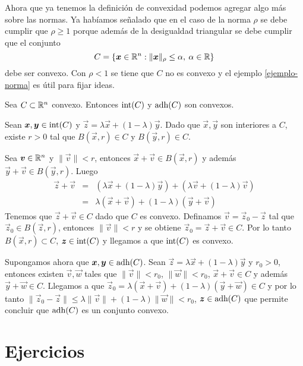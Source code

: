 Ahora que ya tenemos la definici\'on de convexidad podemos agregar algo m\'as sobre las normas. Ya hab\'iamos se\~nalado que en el caso de la norma $\rho$ se debe cumplir que $\rho \geq 1$ porque adem\'as de la desigualdad triangular se debe cumplir que el conjunto
$$C = \{\boldsymbol{x} \in \mathbb{R}^n : \|\boldsymbol{x}\|_{\rho} \leq \alpha,\: \alpha \in \mathbb{R}\}$$
debe ser convexo. Con $\rho <1$ se tiene que $C$ no es convexo y el ejemplo \ref{ejemplo-norma} es \'util para fijar ideas.

\begin{proposicion}
Sea $C \subset \mathbb{R}^n$ convexo. Entonces $\text{int}({C})$ y $\text{adh}({C})$ son convexos.
\end{proposicion}

\begin{demostracion}
Sean $\boldsymbol{x},\boldsymbol{y} \in \text{int}({C})$ y $\vec{z}=\lambda \vec{x} + (1-\lambda) \vec{y}$. Dado que $\vec{x},\vec{y}$ son interiores a $C$, existe $r > 0$ tal que $B(\vec{x},r)\in C$ y $B(\vec{y},r) \in C$. 

Sea $\boldsymbol{v}\in \mathbb{R}^n$ y $\|\vec{v}\|<r$, entonces $\vec{x}+\vec{v} \in B(\vec{x},r)$ y adem\'as $\vec{y}+\vec{v} \in B(\vec{y},r)$. Luego
\begin{eqnarray*}
\vec{z}+\vec{v} &=& \left(\lambda \vec{x} + (1-\lambda)\vec{y} \right) + \left(\lambda \vec{v} + (1-\lambda) \vec{v} \right) \\
&=& \lambda (\vec{x}+\vec{v}) + (1-\lambda) (\vec{y}+\vec{v})
\end{eqnarray*}
Tenemos que $\vec{z}+\vec{v} \in C$ dado que $C$ es convexo. Definamos $\vec{v}=\vec{z}_0-\vec{z}$ tal que $\vec{z}_0 \in B(\vec{z},r)$, entonces $\|\vec{v}\|<r$ y se obtiene $\vec{z}_0=\vec{z}+\vec{v} \in C$. Por lo tanto $B(\vec{x},r)\subset C$, $\boldsymbol{z}\in \text{int}({C})$ y llegamos a que $\text{int}({C})$ es convexo.

Supongamos ahora que $\boldsymbol{x},\boldsymbol{y} \in \text{adh}({C})$. Sean $\vec{z}=\lambda \vec{x} + (1-\lambda) \vec{y}$ y $r_0 > 0$, entonces existen $\vec{v},\vec{w}$ tales que $\|\vec{v}\|< r_0$, $\|\vec{w}\|<r_0$, $\vec{x}+\vec{v} \in C$ y adem\'as $\vec{y}+\vec{w} \in C$. Llegamos a que $\vec{z}_0 = \lambda (\vec{x}+\vec{v}) + (1-\lambda) (\vec{y}+\vec{w}) \in C$ y por lo tanto $\|\vec{z}_0-\vec{z}\|\leq \lambda \|\vec{v}\| + (1-\lambda) \|\vec{w}\| < r_0$, $\boldsymbol{z}\in \text{adh}({C})$ que permite concluir que $\text{adh}({C})$ es un conjunto convexo.
\end{demostracion}

  

\section{Ejercicios}

